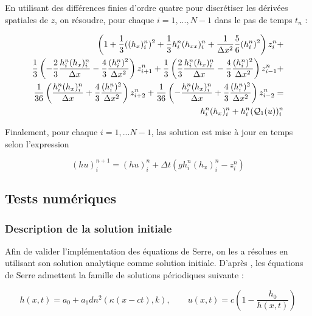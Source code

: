 \indent En utilisant des différences finies d'ordre quatre pour discrétiser les dérivées spatiales de $z$, on résoudre, pour chaque $i = 1,...,N-1$ dans le pas de temps $t_n$ :

\begin{equation*}
	\begin{split}
	 \left( 1 + \frac{1}{3}((h_x)_i^n)^2 + \frac{1}{3}h_i^n (h_{xx})_i^n + \frac{1}{\Delta x^2}\frac{5}{6}(h_i^n)^2\right)z_i^n + \\
	   \frac{1}{3}\left( -\frac{2}{3}\frac{h_i^n(h_x)_i^n}{\Delta x} - \frac{4}{3}\frac{(h_i^n)^2}{\Delta x^2} \right)z_{i+1}^n +  \frac{1}{3}\left( \frac{2}{3}\frac{h_i^n(h_x)_i^n}{\Delta x} - \frac{4}{3}\frac{(h_i^n)^2}{\Delta x^2} \right)z_{i-1}^n  + \\
	   \frac{1}{36}\left( \frac{h_i^n(h_x)_i^n}{\Delta x} + \frac{4}{3}\frac{(h_i^n)^2}{\Delta x^2} \right)z_{i+2}^n + \frac{1}{36}\left( -\frac{h_i^n(h_x)_i^n}{\Delta x} + \frac{4}{3}\frac{(h_i^n)^2}{\Delta x^2} \right)z_{i-2}^n  = \\
	    h_i^n(h_x)_{i}^n  + h_i^n(\mathcal{Q}_1(u))_i^n
	\end{split}
\end{equation*}

\indent Finalement, pour chaque $i=1,...N-1$, las solution est mise à jour en temps selon l'expression 

\begin{equation*}
(hu)_i^{n+1} = (hu)_i^n + \Delta t \left(gh_i^n(h_x)_i^n - z_i^n \right)
\end{equation*}

\subsection{Tests numériques}

\subsubsection{Description de la solution initiale}

\indent Afin de valider l'implémentation des équations de Serre, on les a résolues en utilisant son solution analytique comme solution initiale. D'après \cite{CarterCienfuegos2011}, les équations de Serre admettent la famille de solutions périodiques suivante : 

\begin{equation*}
    h(x,t) = a_0 + a_1 dn^2(\kappa(x-ct),k), \qquad
    u(x,t) = c\left( 1 - \frac{h_0}{h(x,t)}\right)
\end{equation*}

